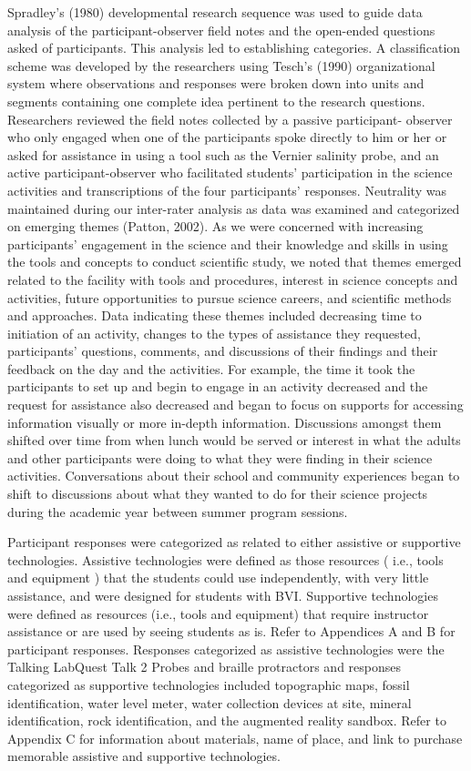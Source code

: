 \documentclass[11pt]{sig-alternate}
\begin{document}
\begin{large}
Spradley’s (1980) developmental research sequence was used to guide data analysis of the participant-observer field notes and the open-ended questions asked of participants. This analysis led to establishing categories. A classification scheme was developed by the researchers using Tesch’s (1990) organizational system where observations and responses were broken down into units and segments containing one complete idea pertinent to the research questions. Researchers reviewed the field notes collected by a passive participant- observer who only engaged when one of the participants spoke directly to him or her or asked for assistance in using a tool such as the Vernier salinity probe, and an active participant-observer who facilitated students’ participation in the science activities and transcriptions of the four participants’ responses. Neutrality was maintained during our inter-rater analysis as data was examined and categorized on emerging themes (Patton, 2002). As we were concerned with increasing participants’ engagement in the science and their knowledge and skills in using the tools and concepts to conduct scientific study, we noted that themes emerged related to the facility with tools and procedures, interest in science concepts and activities, future opportunities to pursue science careers, and scientific methods and approaches. Data indicating these themes included decreasing time to initiation of an activity, changes to the types of assistance they requested, participants’ questions, comments, and discussions of their findings and their feedback on the day and the activities. For example, the time it took the participants to set up and begin to engage in an activity decreased and the request for assistance also decreased and began to focus on supports for accessing information visually or more in-depth information. Discussions amongst them shifted over time from when lunch would be served or interest in what the adults and other participants were doing to what they were finding in their science activities. Conversations about their school and community experiences began to shift to discussions about what they wanted to do for their science projects during the academic year between summer program sessions.

Participant responses were categorized as related to either assistive or supportive technologies. Assistive technologies were defined as those resources ( i.e., tools and equipment ) that the students could use independently, with very little assistance, and were designed for students with BVI. Supportive technologies were defined as resources (i.e., tools and equipment) that require instructor assistance or are used by seeing students as is. Refer to Appendices A and B for participant responses. Responses categorized as assistive technologies were the Talking LabQuest Talk 2 Probes and braille protractors and responses categorized as supportive technologies included topographic maps, fossil identification, water level meter, water collection devices at site, mineral identification, rock identification, and the augmented reality sandbox. Refer to Appendix C for information about materials, name of place, and link to purchase memorable assistive and supportive technologies.

\end{large}
\end{document}
